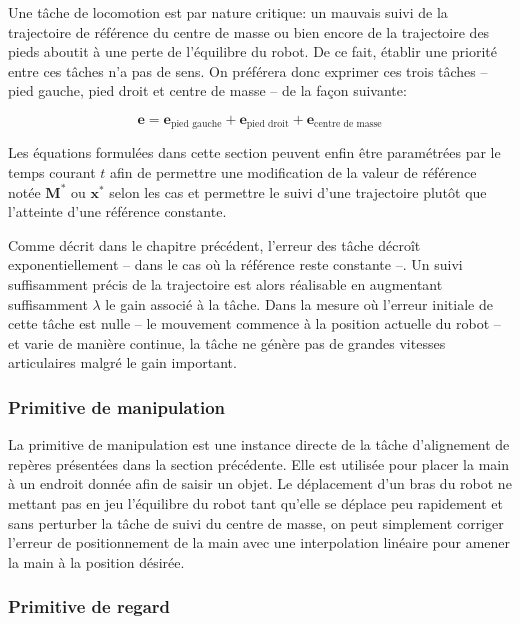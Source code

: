 Une tâche de locomotion est par nature critique: un mauvais suivi de
la trajectoire de référence du centre de masse ou bien encore de la
trajectoire des pieds aboutit à une perte de l'équilibre du robot. De
ce fait, établir une priorité entre ces tâches n'a pas de sens. On
préférera donc exprimer ces trois tâches -- pied gauche, pied droit et
centre de masse -- de la façon suivante:

\begin{equation}
  \mathbf{e} = \mathbf{e}_{\text{pied gauche}} + \mathbf{e}_{\text{pied droit}} + \mathbf{e}_{\text{centre de masse}}
\end{equation}

Les équations formulées dans cette section peuvent enfin être
paramétrées par le temps courant $t$ afin de permettre une
modification de la valeur de référence notée $\mathbf{M}^*$ ou
$\mathbf{x}^*$ selon les cas et permettre le suivi d'une trajectoire
plutôt que l'atteinte d'une référence constante.


Comme décrit dans le chapitre précédent, l'erreur des tâche décroît
exponentiellement -- dans le cas où la référence reste constante
--. Un suivi suffisamment précis de la trajectoire est alors
réalisable en augmentant suffisamment $\lambda$ le gain associé à la
tâche. Dans la mesure où l'erreur initiale de cette tâche est nulle --
le mouvement commence à la position actuelle du robot -- et varie de
manière continue, la tâche ne génère pas de grandes vitesses
articulaires malgré le gain important.


\subsubsection{Primitive de manipulation}


La primitive de manipulation est une instance directe de la tâche
d'alignement de repères présentées dans la section précédente. Elle
est utilisée pour placer la main à un endroit donnée afin de saisir un
objet. Le déplacement d'un bras du robot ne mettant pas en jeu
l'équilibre du robot tant qu'elle se déplace peu rapidement et sans
perturber la tâche de suivi du centre de masse, on peut simplement
corriger l'erreur de positionnement de la main avec une interpolation
linéaire pour amener la main à la position désirée.


\subsubsection{Primitive de regard}


